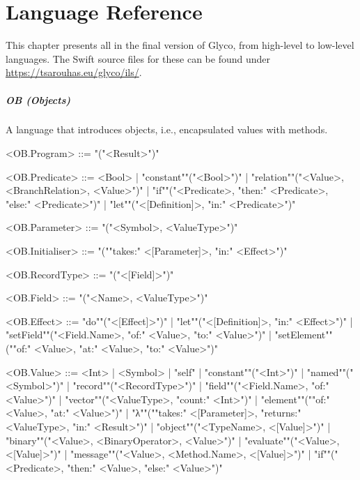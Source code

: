 \documentclass[main.tex]{subfiles}
\begin{document}
\onlyinsubfile{\mainmatter{}\appendix{}}

\chapter{Language Reference}
\label{ch:grammar}
This chapter presents all  in the final version of Glyco, from high-level to low-level languages. The Swift source files for these  can be found under \url{https://tsarouhas.eu/glyco/ils/}.

\paragraph{ OB (Objects) } A language that introduces objects, i.e., encapsulated values with methods.
\begin{grammar}
	\footnotesize
				<OB.Program> ::=
							"("<Result>")"
				\par
				<OB.Predicate> ::=
						<Bool> |
						"constant""("<Bool>")"
						| "relation""("<Value>, <BranchRelation>, <Value>")"
						| "if""("<Predicate>, "then:" <Predicate>, "else:" <Predicate>")"
						| "let""("<[Definition]>, "in:" <Predicate>")"
				\par
				<OB.Parameter> ::=
							"("<Symbol>, <ValueType>")"
				\par
				<OB.Initialiser> ::=
							"(""takes:" <[Parameter]>, "in:" <Effect>")"
				\par
				<OB.RecordType> ::=
							"("<[Field]>")"
				\par
				<OB.Field> ::=
							"("<Name>, <ValueType>")"
				\par
				<OB.Effect> ::=
						"do""("<[Effect]>")"
						| "let""("<[Definition]>, "in:" <Effect>")"
						| "setField""("<Field.Name>, "of:" <Value>, "to:" <Value>")"
						| "setElement""(""of:" <Value>, "at:" <Value>, "to:" <Value>")"
				\par
				<OB.Value> ::=
						<Int> |
								<Symbol> |
						"self"
						| "constant""("<Int>")"
						| "named""("<Symbol>")"
						| "record""("<RecordType>")"
						| "field""("<Field.Name>, "of:" <Value>")"
						| "vector""("<ValueType>, "count:" <Int>")"
						| "element""(""of:" <Value>, "at:" <Value>")"
						| "λ""(""takes:" <[Parameter]>, "returns:" <ValueType>, "in:" <Result>")"
						| "object""("<TypeName>, <[Value]>")"
						| "binary""("<Value>, <BinaryOperator>, <Value>")"
						| "evaluate""("<Value>, <[Value]>")"
						| "message""("<Value>, <Method.Name>, <[Value]>")"
						| "if""("<Predicate>, "then:" <Value>, "else:" <Value>")"

\end{grammar}
\end{document}
